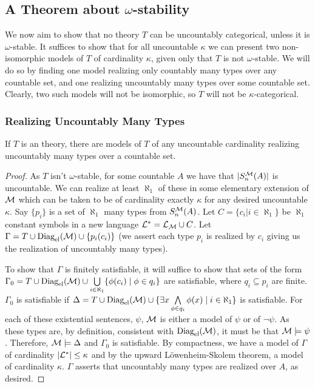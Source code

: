 \subsection{A Theorem about \(\omega\)-stability}
We now aim to show that no theory \(T\) can be uncountably categorical, unless it is \(\omega\)-stable.
It suffices to show that for all uncountable \(\kappa\) we can present two non-isomorphic models of \(T\) of cardinality \(\kappa\), given only that \(T\) is not \(\omega\)-stable.  
We will do so by finding one model realizing only countably many types over any countable set, and one realizing uncountably many types over some countable set. 
Clearly, two such models will not be isomorphic, so \(T\) will not be \(\kappa\)-categorical. 

\subsubsection{Realizing Uncountably Many Types}
\begin{theorem}\label{theorem_realizing_uncountable_types}
If \(T\) is an \omst theory, there are models of \(T\) of any uncountable cardinality realizing uncountably many types over a countable set.
\end{theorem}

\begin{proof}
As \(T\) isn't \(\omega\)-stable, for some countable \(A\) we have that \(|S_n^{\mathcal{M}}(A)|\) is uncountable. 
We can realize at least \(\aleph_1\) of these in some elementary extension of \(\mathcal{M}\) which can be taken to be of cardinality exactly \(\kappa\) for any desired uncountable \(\kappa\).
Say \(\{p_i\}\) is a set of \(\aleph_1\) many types from \(S_n^{\mathcal{M}}(A)\).
Let \(C = \{c_i| i \in \aleph_1\} \) be \(\aleph_1\) constant symbols in a new language \(\mathcal{L}^* = \mathcal{L}_{\mathcal{M}} \cup C\). 
Let \(\Gamma = T \cup \text{Diag}_\text{el}(\mathcal{M}) \cup \{p_i(c_i)\}\) (we assert each type \(p_i\) is realized by \(c_i\) giving us the realization of uncountably many types).
 
To show that \(\Gamma\) is finitely satisfiable, it will suffice to show that sets of the form \(\Gamma_0 = T \cup \text{Diag}_\text{el}(\mathcal{M}) \cup \bigcup\limits_{i \in \aleph_1}\{\phi(c_i) \mid \phi \in q_i\}\) are satisfiable, where \(q_i \subseteq p_i\) are finite.  
\(\Gamma_0\) is satisfiable if \(\Delta = T \cup \text{Diag}_\text{el}(\mathcal{M}) \cup \{\exists x \bigwedge\limits_{\phi \in q_i} \phi(x) \mid i \in \aleph_1\}\) is satisfiable.
For each of these existential sentences, \(\psi\), \(\mathcal{M}\) is either a model of \(\psi\) or of \(\neg \psi\). 
As these types are, by definition, consistent with \(\text{Diag}_\text{el}(\mathcal{M})\), it must be that \(\mathcal{M} \models \psi\). 
Therefore, \(\mathcal{M} \models \Delta\) and \(\Gamma_0\) is satisfiable. 
By compactness, we have a model of \(\Gamma\) of cardinality \(|\mathcal{L}^*| \leq \kappa\) and by the upward L\"owenheim-Skolem theorem, a model of cardinality \(\kappa\).
\(\Gamma\) asserts that uncountably many types are realized over \(A\), as desired. 
\end{proof}

